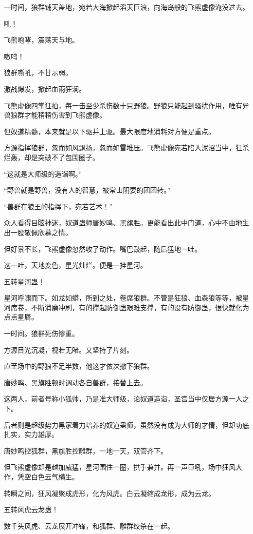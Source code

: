 \begin{this_body}
一时间，狼群铺天盖地，宛若大海掀起滔天巨浪，向海岛般的飞熊虚像淹没过去。

吼！

飞熊咆哮，震荡天与地。

嗷呜！

狼群嘶吼，不甘示弱。

激战爆发，掀起血雨狂澜。

飞熊虚像四掌狂拍，每一击至少杀伤数十只野狼。野狼只能起到骚扰作用，唯有异兽狼群才能稍稍伤害到飞熊虚像。

但奴道精髓，本来就是以下驱并上驱。最大限度地消耗对方便是重点。

方源指挥狼群，忽而如风飘扬，忽而如雪堆压。飞熊虚像宛若陷入泥沼当中，狂杀烂轰，却是突破不了包围圈子。

“这就是大师级的造诣啊。”

“野兽就是野兽，没有人的智慧，被常山阴耍的团团转。”

“兽群在狼王的指挥下，宛若艺术！”

众人看得目眩神迷，奴道蛊师唐妙鸣、黑旗胜。更能看出此中门道，心中不由地生出一股敬佩欣慕之情。

但好景不长，飞熊虚像忽然收了动作。嘴巴鼓起，随后猛地一吐。

这一吐，天地变色，星光灿烂。便是一挂星河。

五转星河蛊！

星河呼啸而下。如龙如蟒，所到之处，卷席狼群。不管是狂狼、血森狼等等，被星河席卷，不断消磨冲刷，有的撑起防御蛊艰难支撑，有的没有防御蛊，很快就化为点点星屑。

一时间。狼群死伤惨重。

方源目光沉凝，视若无睹。又坚持了片刻。

直至场中的野狼不足半数，他这才依次撤下狼群。

唐妙鸣、黑旗胜顿时调动各自兽群，接替上去。

这两人，前者号称小狐帅，乃是准大师级，论奴道造诣，圣宫当中仅居方源一人之下。

后者则是超级势力黑家着力培养的奴道蛊师，虽然没有成为大师的才情，但却功底扎实，实力雄厚。

唐妙鸣控狐群，黑旗胜控雕群，一地一天，双管齐下。

但飞熊虚像却是越加威猛，星河围住一圈，拱手兼并。再一声巨吼，场中狂风大作，凭空白色云气横生。

转瞬之间，狂风凝聚成虎形，化为风虎。白云凝缩成龙形，成为云龙。

五转风虎云龙蛊！

数千头风虎、云龙展开冲锋，和狐群、雕群绞杀在一起。


\end{this_body}
